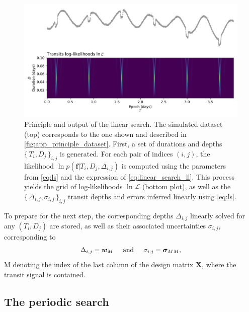 \documentclass{aastex631}
\newcommand{\set}[1]{\{\,#1\,\}}
\begin{document}
\begin{figure}[H]
    \begin{centering}
        \includegraphics[width=0.8\linewidth]{principle_linear_search.pdf}
        \caption{Principle and output of the linear search. The simulated dataset (top) corresponds to the one shown and described in \autoref{fig:app_principle_dataset}. First, a set of durations and depths $\set{T_i, D_j}_{i,j}$ is generated. For each pair of indices $(i,j)$, the likelihood $\ln p(\bm{f} \vert T_i ,D_j, \Delta_{i,j})$ is computed using the parameters from \autoref{eq:ls} and the expression of \autoref{eq:linear_search_ll}. This process yields the grid of log-likelihoods $\ln\mathcal{L}$ (bottom plot), as well as the $\set{\Delta_{i,j}, \sigma_{i,j}}_{i, j}$ transit depths and errors inferred linearly using \autoref{eq:ls}.}
        \label{fig:linear_search}
    \end{centering}
\end{figure}

\noindent To prepare for the next step, the corresponding depths $\Delta_{i,j}$ linearly solved for any $(T_i ,D_j)$ are stored, as well as their associated uncertainties $\sigma_{i,j}$, corresponding to
\begin{equation*}
    \Delta_{i,j} = \bm{w}_M \hspace{0.5cm}\text{and}\hspace{0.5cm} \sigma_{i,j} = \bm{\sigma}_{MM},
\end{equation*}
M denoting the index of the last column of the design matrix $\bm{X}$, where the transit signal is contained.

\subsection{The periodic search}
\end{document}
